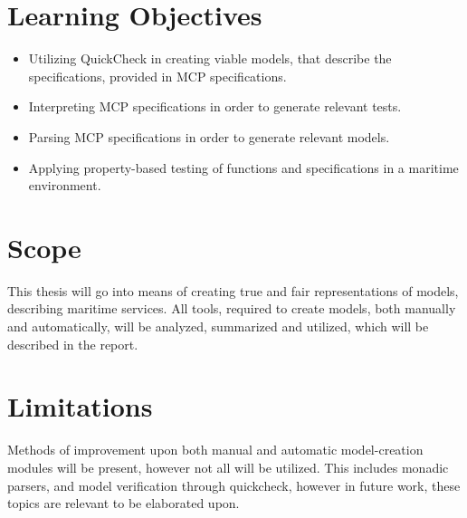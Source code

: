 \section{Learning Objectives}

\begin{itemize}
  \item Utilizing QuickCheck in creating viable models, that describe the specifications, provided in MCP specifications.
  \item Interpreting MCP specifications in order to generate relevant tests.
  \item Parsing MCP specifications in order to generate relevant models.
  \item Applying property-based testing of functions and specifications in a maritime environment.
\end{itemize}

\section{Scope}
This thesis will go into means of creating true and fair representations of models, describing maritime services. All tools, required to create models, both manually and automatically, will be analyzed, summarized and utilized, which will be described in the report.

\section{Limitations}
Methods of improvement upon both manual and automatic model-creation modules will be present, however not all will be utilized. This includes monadic parsers, and model verification through quickcheck, however in future work, these topics are relevant to be elaborated upon.

